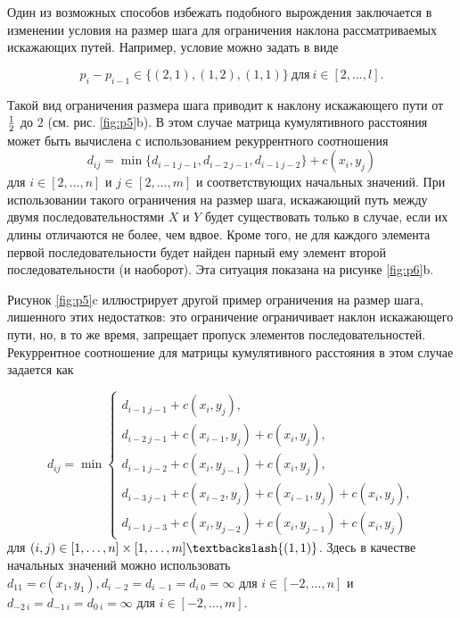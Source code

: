 \documentclass[a4paper, 14pt]{extarticle}
\numberwithin{figure}{subsection}
\numberwithin{equation}{subsection}
\begin{document}
Один из возможных способов избежать подобного вырождения заключается в изменении условия на размер шага для ограничения наклона рассматриваемых искажающих путей. Например, условие можно задать в виде

\begin{equation}
	p_i-p_{i-1} \in \{(2,1),(1,2),(1,1)\}\> \text{для} \> i \in [2,\dots,l].
\end{equation}

Такой вид ограничения размера шага приводит к наклону искажающего пути от $1 \over 2$ до $2$ (см. рис. \ref{fig:p5}b). В этом случае матрица кумулятивного расстояния может быть вычислена с использованием рекуррентного соотношения
\begin{equation}
	d_{ij}=\min\{d_{i-1 \> j-1}, d_{i-2 \> j-1}, d_{i-1 \> j-2}\} + c(x_i, y_j)
\end{equation}
для $i \in [2,\dots,n]$ и $j \in [2,\dots,m]$ и соответствующих начальных значений. При использовании такого ограничения на размер шага, искажающий путь между двумя последовательностями $X$ и $Y$ будет существовать только в случае, если их длины отличаются не более, чем вдвое. Кроме того, не для каждого элемента первой последовательности будет найден парный ему элемент второй последовательности (и наоборот). Эта ситуация показана на рисунке \ref{fig:p6}b.

Рисунок \ref{fig:p5}c иллюстрирует другой пример ограничения на размер шага, лишенного этих недостатков: это ограничение ограничивает наклон искажающего пути, но, в то же время, запрещает пропуск элементов последовательностей. Рекуррентное соотношение для матрицы кумулятивного расстояния в этом случае задается как

\begin{equation}
	d_{ij} = \min
\begin{cases}
	d_{i-1 \> j-1} + c(x_i, y_j),\\
	d_{i-2 \> j-1} + c(x_{i-1},y_j) + c(x_i,y_j),\\
	d_{i-1 \> j-2} + c(x_i,y_{j-1}) + c(x_i,y_j),\\
	d_{i-3 \> j-1} + c(x_{i-2},y_j) + c(x_{i-1},y_j) + c(x_i,y_j),\\
	d_{i-1 \> j-3} + c(x_i,y_{j-2}) + c(x_i,y_{j-1}) + c(x_i,y_j)
\end{cases}
\end{equation}
для $(i,j) \in [1,\dots,n] \times [1,\dots,m] \textbackslash \{(1,1)\}$. Здесь в качестве начальных значений можно использовать $d_{1 1} = c(x_1,y_1), d_{i \> -2} = d_{i \> -1} = d_{i \> 0} = \infty$ для $i \in [-2,\dots, n]$ и $d_{-2 \> i} = d_{-1 \> i} = d_{0 \> i} = \infty$  для $i \in [-2,\dots, m]$.
\end{document}
